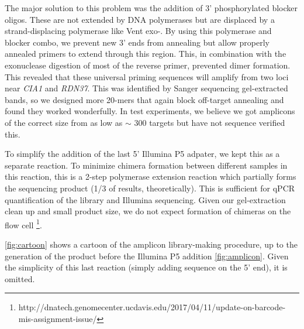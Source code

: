 The major solution to this problem was the addition of 3' phosphorylated
blocker oligos. These are not extended by DNA polymerases but are
displaced by a strand-displacing polymerase like Vent exo-. By using
this polymerase and blocker combo, we prevent new 3' ends from annealing
but allow properly annealed primers to extend through this region. This,
in combination with the exonuclease digestion of most of the reverse
primer, prevented dimer formation. This revealed that these universal
priming sequences will amplify from two loci near \emph{CIA1} and
\emph{RDN37}. This was identified by Sanger sequencing gel-extracted
bands, so we designed more 20-mers that again block off-target annealing
and found they worked wonderfully. In test experiments, we believe we
got amplicons of the correct size from as low as \(\sim\) 300 targets
but have not sequence verified this.

To simplify the addition of the last 5' Illumina P5 adpater, we kept
this as a separate reaction. To minimize chimera formation between
different samples in this reaction, this is a 2-step polymerase
extension reaction which partially forms the sequencing product (1/3 of
results, theoretically). This is sufficient for qPCR quantification of
the library and Illumina sequencing. Given our gel-extraction clean up
and small product size, we do not expect formation of chimeras on the
flow cell \footnote{http://dnatech.genomecenter.ucdavis.edu/2017/04/11/update-on-barcode-mis-assignment-issue/}.

\autoref{fig:cartoon} shows a cartoon of
the amplicon library-making procedure, up to the generation of the
product before the Illumina P5 addition \autoref{fig:amplicon}. 
Given the simplicity of this
last reaction (simply adding sequence on the 5' end), it is omitted.


%  


